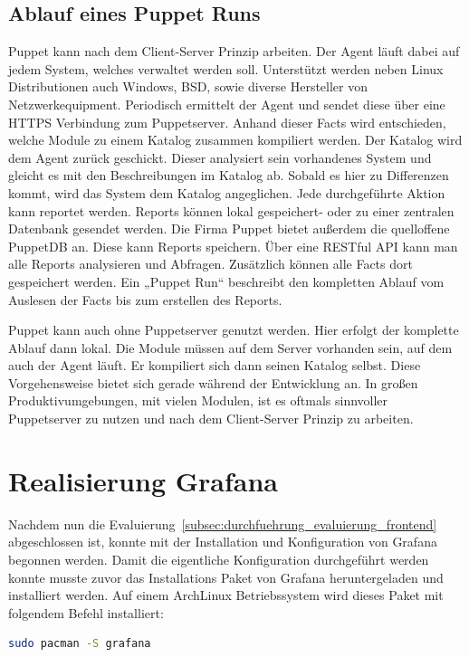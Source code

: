 \subsection{Ablauf eines Puppet Runs}
Puppet kann nach dem \gls{Client-Server} Prinzip arbeiten. Der Agent läuft
dabei auf jedem System, welches verwaltet werden soll. Unterstützt werden neben
Linux Distributionen auch Windows, BSD, sowie diverse Hersteller von
Netzwerkequipment. Periodisch ermittelt der Agent  und
sendet diese über eine \gls{HTTPS} Verbindung zum Puppetserver. Anhand dieser
Facts wird entschieden, welche Module zu einem Katalog zusammen kompiliert
werden. Der Katalog wird dem Agent zurück geschickt. Dieser analysiert sein
vorhandenes System und gleicht es mit den Beschreibungen im Katalog ab. Sobald
es hier zu Differenzen kommt, wird das System dem Katalog angeglichen. Jede
durchgeführte Aktion kann reportet werden. Reports können lokal gespeichert-
oder zu einer zentralen Datenbank gesendet werden. Die Firma Puppet bietet
außerdem die quelloffene PuppetDB an. Diese kann Reports speichern. Über eine
\gls{RESTful} API kann man alle Reports analysieren und Abfragen. Zusätzlich
können alle Facts dort gespeichert werden. Ein „Puppet Run“ beschreibt den
kompletten Ablauf vom Auslesen der Facts bis zum erstellen des Reports.

Puppet kann auch ohne Puppetserver genutzt werden. Hier erfolgt der komplette
Ablauf dann lokal. Die Module müssen auf dem Server vorhanden sein, auf dem
auch der Agent läuft. Er kompiliert sich dann seinen Katalog selbst. Diese
Vorgehensweise bietet sich gerade während der Entwicklung an. In großen
Produktivumgebungen, mit vielen Modulen, ist es oftmals sinnvoller Puppetserver
zu nutzen und nach dem Client-Server Prinzip zu arbeiten.
\tm%

\section{Realisierung Grafana}
\label{sec:realisierung_Grafana} Nachdem nun die
Evaluierung~\ref{subsec:durchfuehrung_evaluierung_frontend} abgeschlossen ist,
konnte mit der Installation und Konfiguration von Grafana begonnen werden.
Damit die eigentliche Konfiguration durchgeführt werden konnte musste zuvor das
Installations Paket von Grafana heruntergeladen und installiert werden. Auf
einem ArchLinux Betriebssystem wird dieses Paket mit folgendem Befehl
installiert:

\begin{lstlisting}[language=bash]
sudo pacman -S grafana
\end{lstlisting}

